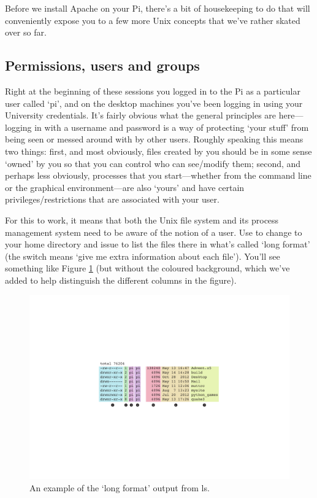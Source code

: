 Before we install Apache on your Pi, there's a bit of housekeeping to do that will conveniently expose you to a few more Unix concepts that we've rather skated over so far. 

\subsection{Permissions, users and groups}

Right at the beginning of these sessions you logged in to the Pi as a particular user called `pi', and on the desktop machines you've been logging in using your University credentials. It's fairly obvious what the general principles are here---logging in with a username and password is a way of protecting `your stuff' from being seen or messed around with by other users. Roughly speaking this means two things: first, and most obviously, files created by you should be in some sense `owned' by you so that you can control who can see/modify them; second, and perhaps less obviously, processes that you start---whether from the command line or the graphical environment---are also `yours' and have certain privileges/restrictions that are associated with your user. 

For this to work, it means that both the Unix file system and its process management system need to be aware of the notion of a user. Use  to change to your home directory and issue  to list the files there in what's called `long format' (the  switch means `give me extra information about each file'). You'll see something like Figure \ref{figure:longformls} (but without the coloured background, which we've added to help distinguish the different columns in the figure).

\begin{figure}
\centerline{\includegraphics[width=14cm]{images/longformls}}
\caption{An example of the `long format' output from ls.}\label{figure:longformls}
\end{figure}

